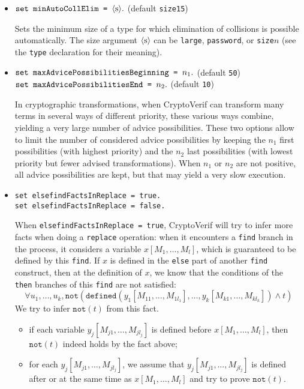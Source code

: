 \begin{itemize}
\begin{itemize}
\item $\texttt{set minAutoCollElim = }\langle\textrm{s}\rangle{\tt .}$ (default \texttt{size15})

Sets the minimum size of a type for which elimination of collisions is
possible automatically. The size argument $\langle\textrm{s}\rangle$ can be \texttt{large}, \texttt{password}, or \texttt{size}$n$ (see the \texttt{type} declaration for their meaning).

\item $\texttt{set maxAdvicePossibilitiesBeginning = }n_1{\tt .}$ (default \texttt{50})\\
$\texttt{set maxAdvicePossibilitiesEnd = }n_2{\tt .}$ (default \texttt{10})

In cryptographic transformations, when CryptoVerif can transform many terms in several ways of different priority, these various ways combine, yielding a very large number of advice possibilities. These two options allow to limit the number of considered advice possibilities by keeping the $n_1$ first possibilities (with highest priority) and the $n_2$ last possibilities (with lowest priority but fewer advised transformations). When $n_1$ or $n_2$ are not positive, all advice possibilities are kept, but that may yield a very slow execution. 

\item \texttt{set elsefindFactsInReplace = true.}\\
\texttt{set elsefindFactsInReplace = false.}

When \texttt{elsefindFactsInReplace = true}, CryptoVerif will try to
infer more facts when doing a \texttt{replace} operation: when it
encounters a \texttt{find} branch in the process, it considers a
variable $x[M_1, \ldots, M_l]$, which is guaranteed to be defined by this \texttt{find}.
If $x$ is defined in the \texttt{else} part of another \texttt{find}
construct, then at the definition of $x$, we know that the conditions
of the \texttt{then} branches of this \texttt{find} are not satisfied:
\[\forall u_1, \ldots, u_k, \texttt{not}(\texttt{defined}(y_1[M_{11}, \ldots, M_{1l_1}], \ldots, y_k[M_{k1}, \ldots, M_{kl_k}]) \wedge t)\]
We try to infer $\texttt{not}(t)$ from this fact.
\begin{itemize}
\item if each variable $y_j[M_{j1}, \ldots, M_{jl_j}]$ is defined before $x[M_1, \ldots, M_l]$,
then $\texttt{not}(t)$ indeed holds by the fact above;
\item for each $y_j[M_{j1}, \ldots, M_{jl_j}]$, 
we assume that $y_j[M_{j1}, \ldots, M_{jl_j}]$ is defined after or at the same time as $x[M_1, \ldots, M_l]$
and try to prove $\texttt{not}(t)$.


\end{itemize}
\end{itemize}
\end{itemize}
